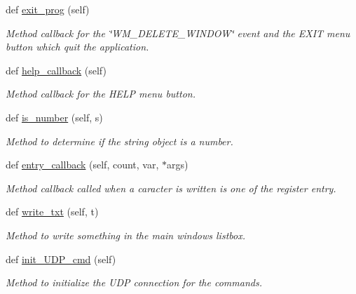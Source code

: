 \begin{DoxyCompactItemize}
def \mbox{\hyperlink{classwatchman_1_1_watchman__main__window_a71f57c7e1cd7b428c2a0f926ff6db0dd}{exit\+\_\+prog}} (self)
\begin{DoxyCompactList}\small\item\em Method callback for the \char`\"{}\+W\+M\+\_\+\+D\+E\+L\+E\+T\+E\+\_\+\+W\+I\+N\+D\+O\+W\char`\"{} event and the E\+X\+IT menu button which quit the application. \end{DoxyCompactList}\item 
def \mbox{\hyperlink{classwatchman_1_1_watchman__main__window_ae4234a2c7ef7fa102846ee2cc3089181}{help\+\_\+callback}} (self)
\begin{DoxyCompactList}\small\item\em Method callback for the H\+E\+LP menu button. \end{DoxyCompactList}\item 
def \mbox{\hyperlink{classwatchman_1_1_watchman__main__window_ab13d784cf818f892727af9b2caa1c7fb}{is\+\_\+number}} (self, s)
\begin{DoxyCompactList}\small\item\em Method to determine if the string object is a number. \end{DoxyCompactList}\item 
def \mbox{\hyperlink{classwatchman_1_1_watchman__main__window_ad063c9cf9786f9b04da469c373ab9e73}{entry\+\_\+callback}} (self, count, var, $\ast$args)
\begin{DoxyCompactList}\small\item\em Method callback called when a caracter is written is one of the register entry. \end{DoxyCompactList}\item 
def \mbox{\hyperlink{classwatchman_1_1_watchman__main__window_a9d3d9649b92b0e4098ba66205b4baf83}{write\+\_\+txt}} (self, t)
\begin{DoxyCompactList}\small\item\em Method to write something in the main window\textquotesingle{}s listbox. \end{DoxyCompactList}\item 
def \mbox{\hyperlink{classwatchman_1_1_watchman__main__window_a0a178263901747708694c0fd4aa2e3a7}{init\+\_\+\+U\+D\+P\+\_\+cmd}} (self)
\begin{DoxyCompactList}\small\item\em Method to initialize the U\+DP connection for the commands. \end{DoxyCompactList}\item 

\end{DoxyCompactItemize}
